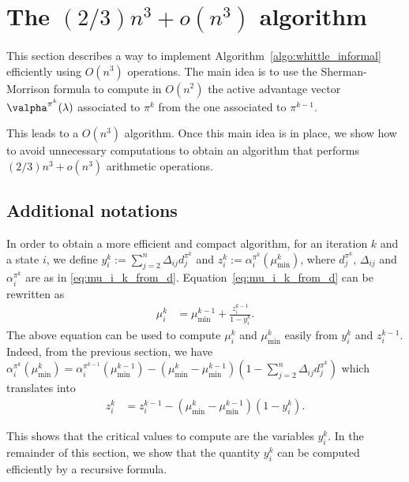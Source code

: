 \section{The \texorpdfstring{$(2/3)n^3 + o(n^3)$}{2n3/3+o(n3)} algorithm}
\label{sec:formal_widx_algo}

This section describes a way to implement Algorithm~\ref{algo:whittle_informal}  efficiently using  $O(n^3)$ operations.
The main idea is to use the Sherman-Morrison formula to compute in $O(n^2)$ the active advantage vector $\valpha^{\pi^k}(\lambda)$ associated to $\pi^k$ from the one associated to $\pi^{k-1}$.

This leads to a $O(n^3)$ algorithm. Once this main idea is in place, we show how to avoid unnecessary computations to obtain an algorithm that performs $(2/3)n^3+o(n^3)$ arithmetic operations.

\subsection{Additional notations}

In order to obtain a more efficient and compact algorithm, for an iteration $k$ and a state $i$, we define $y^k_i:=\sum_{j=2}^n\Delta_{ij}d_j^{\pi^k}$ and $z^k_i:=\alpha^{\pi^k}_i(\mu^k_{\min})$, where $d_j^{\pi^k}$, $\Delta_{ij}$ and $\alpha^{\pi^k}_i$ are as in \eqref{eq:mu_i_k_from_d}.
Equation~\eqref{eq:mu_i_k_from_d} can be rewritten as
\begin{align}
    \mu_i^k &= \mu^{k-1}_{\min} +\displaystyle\frac{z_i^{k-1}}{1-y_i^k}.
    \label{eq:mu^k_i_from_y}
\end{align}
The above equation can be used to compute $\mu_i^k$ and $\mu^k_{\min}$ easily from $y^k_i$ and $z^{k-1}_i$. 
Indeed, from the previous section, we have $\alpha^{\pi^k}_i(\mu^k_{\min}) = \alpha^{\pi^{k-1}}_i(\mu^{k-1}_{\min}) -(\mu^k_{\min} -\mu^{k-1}_{\min})(1 -\sum_{j=2}^n\Delta_{ij}d_j^{\pi^k})$ which translates into
\begin{align}
    z^k_i &= z^{k-1}_i -(\mu^k_{\min} -\mu^{k-1}_{\min})(1 -y^k_i). \label{eq:z^k-i}
\end{align}

This shows that the critical values to compute are the variables $y^k_i$. In the remainder of this section, we show that the quantity $y^k_i$ can be computed efficiently by a recursive formula.

